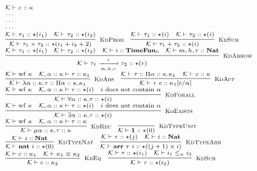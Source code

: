 \documentclass[fleqn]{article}
\begin{document}
\[
\scriptsize
\begin{array}{l}
	\mathcal{K} \vdash c :: \kappa \\
	\cdots \\
	\cdots \\
	\cdots \\
	\infer[\textsc{KdProd}]{\mathcal{K} \vdash \tau_1 \times \tau_2 :: \star(i_1+i_2+2)}{\mathcal{K} \vdash \tau_1 :: \star(i_1) & \mathcal{K} \vdash \tau_2 :: \star(i_2)} \hspace{1em}
	\infer[\textsc{KdSum}]{\mathcal{K} \vdash \tau_1 + \tau_2 :: \star(i)}{\mathcal{K} \vdash \tau_1 :: \star(i) & \mathcal{K} \vdash \tau_2 :: \star(i)} \\
	\infer[\textsc{KdArrow}]{\mathcal{K} \vdash \tau_1 \xrightarrow[m,h,r]{i} \tau_2 :: \star(r)}{\mathcal{K} \vdash \tau_1 :: \star(i_1) & \mathcal{K} \vdash \tau_2 :: \star(i_2) & \mathcal{K} \vdash i :: \mathbf{TimeFun}_0 & \mathcal{K} \vdash m,h,r :: \mathbf{Nat}} \\
	\infer[\textsc{KdAbs}]{\mathcal{K} \vdash \lambda \alpha :: \kappa. \tau :: \Pi \alpha :: \kappa. \kappa_1}{\mathcal{K} \vdash \mathrm{wf}~\kappa & \mathcal{K},\alpha::\kappa \vdash \tau :: \kappa_1} \hspace{1em}
	\infer[\textsc{KdApp}]{\mathcal{K} \vdash \tau~c :: \kappa_1[c/\alpha]}{\mathcal{K} \vdash \tau :: \Pi \alpha :: \kappa. \kappa_1 & \mathcal{K} \vdash c :: \kappa} \\
	\infer[\textsc{KdForall}]{\mathcal{K} \vdash \forall \alpha :: \kappa. \tau :: \star(i)}{\mathcal{K} \vdash \mathrm{wf}~\kappa & \mathcal{K},\alpha :: \kappa \vdash \tau :: \star(i) & i~\mathrm{does~not~contain}~\alpha} \\
	\infer[\textsc{KdExists}]{\mathcal{K} \vdash \exists \alpha :: \kappa. \tau :: \star(i)}{\mathcal{K} \vdash \mathrm{wf}~\kappa & \mathcal{K},\alpha :: \kappa \vdash \tau :: \star(i) & i~\mathrm{does~not~contain}~\alpha} \\
	\infer[\textsc{KdRec}]{\mathcal{K} \vdash \mu \alpha :: \kappa. \tau :: \kappa}{\mathcal{K} \vdash \mathrm{wf}~\kappa & \mathcal{K},\alpha::\kappa \vdash \tau :: \kappa} \hspace{1em}
	\infer[\textsc{KdTypeUnit}]{\mathcal{K} \vdash \mathbf{1} :: \star(0)}{} \\
	\infer[\textsc{KdTypeNat}]{\mathcal{K} \vdash \mathbf{nat}~i :: \star(0)}{\mathcal{K} \vdash i :: \mathbf{Nat}} \hspace{1em}
	\infer[\textsc{KdTypeArr}]{\mathcal{K} \vdash \mathbf{arr}~\tau~i :: \star((j + 1) \times i)}{\mathcal{K} \vdash \tau :: \star(j) & \mathcal{K} \vdash i :: \mathbf{Nat}} \\
	\infer[\textsc{KdEq}]{\mathcal{K} \vdash c :: \kappa_2}{\mathcal{K} \vdash c :: \kappa_1 & \mathcal{K} \vdash \kappa_1 \equiv \kappa_2} \hspace{1em}
	\infer[\textsc{KdSub}]{\mathcal{K} \vdash \tau :: \star(i_2)}{\mathcal{K} \vdash \tau :: \star(i_1) & \mathcal{K} \vdash i_1 \le_n i_2}
\end{array}
\]
\end{document}
